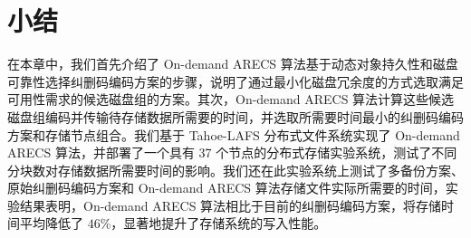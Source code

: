 \section{小结}
在本章中，我们首先介绍了 On-demand ARECS 算法基于动态对象持久性和磁盘可靠性选择纠删码编码方案的步骤，说明了通过最小化磁盘冗余度的方式选取满足可用性需求的候选磁盘组的方案。其次，On-demand ARECS 算法计算这些候选磁盘组编码并传输待存储数据所需要的时间，并选取所需要时间最小的纠删码编码方案和存储节点组合。我们基于 Tahoe-LAFS 分布式文件系统实现了 On-demand ARECS 算法，并部署了一个具有 37 个节点的分布式存储实验系统，测试了不同分块数对存储数据所需要时间的影响。我们还在此实验系统上测试了多备份方案、原始纠删码编码方案和 On-demand ARECS 算法存储文件实际所需要的时间，实验结果表明，On-demand ARECS 算法相比于目前的纠删码编码方案，将存储时间平均降低了 $46\%$，显著地提升了存储系统的写入性能。
